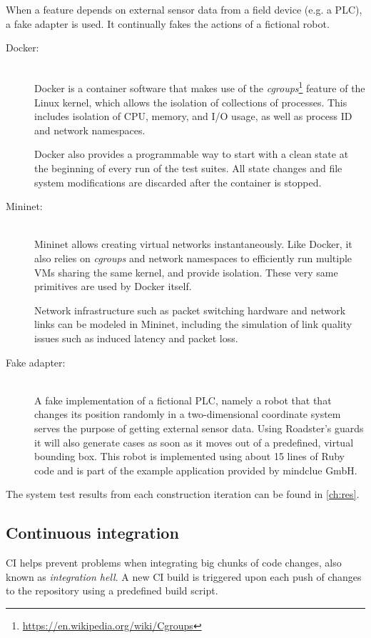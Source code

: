 When a feature depends on external sensor data from a field device (e.g. a \gls{PLC}),
a fake adapter is used. It continually fakes the actions of a fictional robot.

\begin{description}
	\item [Docker:]\hfill\\
		Docker is a container software that makes use of the
		\emph{cgroups}\footnote{\url{https://en.wikipedia.org/wiki/Cgroups}}
		feature of the Linux kernel, which allows the isolation of
		collections of processes. This includes isolation of CPU,
		memory, and I/O usage, as well as process ID and network
		namespaces.

		Docker also provides a programmable way to start with a clean
		state at the beginning of every run of the test suites. All
		state changes and file system modifications are discarded after
		the container is stopped.

	\item [Mininet:]\hfill\\
		Mininet allows creating virtual networks instantaneously.
		Like Docker, it also relies on \emph{cgroups}
		and network namespaces to efficiently run multiple \glspl{VM}
		sharing the same kernel, and provide isolation. These very same
		primitives are used by Docker itself.

		Network infrastructure such as packet switching hardware and
		network links can be modeled in Mininet, including the
		simulation of link quality issues such as induced latency and
		packet loss.

	\item [Fake adapter:]\hfill\\
		A fake implementation of a fictional \gls{PLC}, namely a robot
		that that changes its position randomly in a two-dimensional coordinate
		system serves the purpose of getting external sensor data.
		Using Roadster's guards it will also generate cases as soon as
		it moves out of a predefined, virtual bounding box. This robot
		is implemented using about 15 lines of Ruby code and is part of
		the example application provided by mindclue GmbH.
\end{description}

The system test results from each construction iteration can be found in \autoref{ch:res}.


\subsection{Continuous integration}
\Gls{CI} helps prevent problems when integrating big chunks of code changes,
also known as \emph{integration hell}. A new CI build is triggered upon each
push of changes to the repository using a predefined build script.


